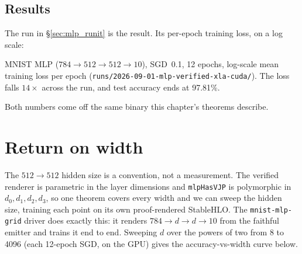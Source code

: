 \subsection*{Results}

The run in \S\ref{sec:mlp_runit} is the result. Its per-epoch training
loss, on a log scale:

\begin{center}
\end{center}

\noindent MNIST MLP ($784{\to}512{\to}512{\to}10$), SGD~0.1, 12 epochs,
log-scale mean training loss per epoch
(\texttt{runs/2026-09-01-mlp-verified-xla-cuda/}). The loss falls
$14\times$ across the run, and test accuracy ends at 97.81\%.

Both numbers come off the same binary this chapter's theorems describe.

\section{Return on width}

The $512{\to}512$ hidden size is a convention, not a measurement. The
verified renderer is parametric in the layer dimensions and
\texttt{mlpHasVJP} is polymorphic in $d_0,d_1,d_2,d_3$, so one theorem
covers every width and we can sweep the hidden size, training each point
on its own proof-rendered StableHLO. The \texttt{mnist-mlp-grid} driver does
exactly this: it renders $784{\to}d{\to}d{\to}10$ from the faithful emitter
and trains it end to end. Sweeping $d$ over the powers of two from 8 to 4096
(each 12-epoch SGD, on the GPU) gives the accuracy-vs-width curve below.


